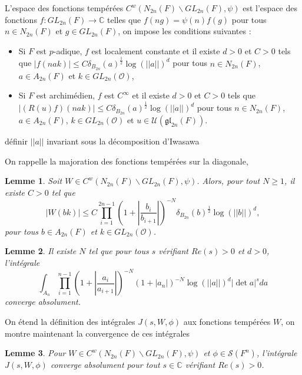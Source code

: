 \documentclass{amsart}
\newtheorem{lemme}{Lemme}[section]
\begin{document}
 L'espace des fonctions tempérées $C^w(N_{2n}(F)\backslash{GL_{2n}(F)}, \psi)$ est l'espace des fonctions $f : GL_{2n}(F) \rightarrow \mathbb{C}$ telles que $f(ng) = \psi(n)f(g)$ pour tous $n \in N_{2n}(F)$ et $g \in GL_{2n}(F)$, on impose les conditions suivantes :
 \begin{itemize}
 \item Si $F$ est $p$-adique, $f$ est localement constante et il existe $d > 0$ et $C > 0$ tels que $|f(nak)| \leq C \delta_{B_{2n}}(a)^{\frac{1}{2}} \log(||a||)^d$ pour tous $n \in N_{2n}(F)$, $a \in A_{2n}(F)$ et $k \in GL_{2n}(\mathcal{O})$,
 \item Si $F$ est archimédien, $f$ est $C^\infty$ et il existe $d > 0$ et $C > 0$ tels que $|(R(u)f)(nak)| \leq C \delta_{B_{2n}}(a)^{\frac{1}{2}} \log(||a||)^d$ pour tous $n \in N_{2n}(F)$, $a \in A_{2n}(F)$, $k \in GL_{2n}(\mathcal{O})$ et $u \in \mathcal{U}(\mathfrak{gl}_{2n}(F))$.
 \end{itemize}
 
 définir $||a||$ invariant sous la décomposition d'Iwasawa
 
 
On rappelle la majoration des fonctions tempérées sur la diagonale,
\begin{lemme}
\label{majtemp}
Soit $W \in C^w(N_{2n}(F)\backslash{GL_{2n}(F)}, \psi)$. Alors, pour tout $N \geq 1$, il existe $C > 0$ tel que
\begin{equation}
|W(bk)| \leq C\prod_{i=1}^{2n-1} (1 + |\frac{b_i}{b_{i+1}}|)^{-N}\delta_{B_{2n}}(b)^{\frac{1}{2}}\log(||b||)^d,
\end{equation}
pour tous $b \in A_{2n}(F)$ et $k \in GL_{2n}(\mathcal{O})$.
\end{lemme}

\begin{lemme}
Il existe $N$ tel que pour tous $s$ vérifiant $Re(s) > 0$ et $d > 0$, l'intégrale
\begin{equation}
\int_{A_n} \prod_{i=1}^{n-1} (1+|\frac{a_i}{a_{i+1}}|)^{-N}(1+|a_n|)^{-N}\log(||a||)^d|\det a|^s da
\end{equation}
converge absolument.
\end{lemme}

On étend la définition des intégrales $J(s, W, \phi)$ aux fonctions tempérées $W$, on montre maintenant la convergence de ces intégrales
\begin{lemme}
\label{convtemp}
Pour $W \in C^w(N_{2n}(F)\backslash{GL_{2n}(F)}, \psi)$ et $\phi \in \mathcal{S}(F^n)$, l'intégrale $J(s, W, \phi)$ converge absolument pour tout $s \in \mathbb{C}$ vérifiant $Re(s) > 0$.
\end{lemme}
 
\end{document}
